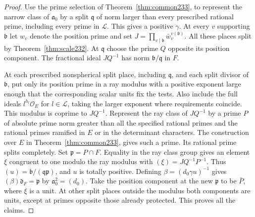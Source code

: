 \documentclass[a4paper,11pt]{article}
\theoremstyle{definition}
\theoremstyle{remark}
\numberwithin{equation}{section}
\newcommand{\OO}{\mathcal O}
\begin{document}
\begin{proof}
Use the prime selection of Theorem~\ref{thm:common233},
to represent the narrow class of \(\mathfrak a_0\) by a split
\(\mathfrak q\) of norm larger than every prescribed rational prime,
including every prime in \(\mathcal L\). This gives
a positive \(\gamma\). At every \(v\) supporting \(\mathfrak b\)
let \(w_v\) denote the position prime and set
\(J=\prod_{v\mid\mathfrak b}\bar w_v^{v(\mathfrak b)}\).
All these places split by Theorem~\ref{thm:scale232}.
At \(\mathfrak q\) choose the prime \(Q\) opposite its position
component. The fractional ideal \(JQ^{-1}\) has norm
\(\mathfrak b/\mathfrak q\) in \(F\).

At each prescribed nonspherical split place, including
\(\mathfrak q\), and each split divisor of \(\mathfrak b\), put
only its position prime in a ray modulus with a positive exponent
large enough that the corresponding scalar units fix the tests.
Also include the full ideals \(l^{h_l}\OO_E\) for \(l\in\mathcal L\),
taking the larger exponent where requirements coincide. This
modulus is coprime to \(JQ^{-1}\). Represent the ray class of
\(JQ^{-1}\) by a prime \(P\) of absolute prime norm greater than
all the specified rational primes and the rational primes ramified
in \(E\) or in the determinant characters. The construction over
\(E\) in Theorem~\ref{thm:common233}, gives such a
prime. Its rational prime splits completely. Set
\(\mathfrak p=P\cap F\). Equality in the ray class group gives
an element \(\xi\) congruent to one modulo the ray modulus with
\((\xi)=JQ^{-1}P^{-1}\). Thus
\((u)=\mathfrak b/(\mathfrak q\mathfrak p)\), and \(u\) is
totally positive. Defining \(\beta=(d_0\gamma u)^{-1}\) gives
\((\beta)\mathfrak d_F=\mathfrak p\) by \(\mathfrak a_0^2=(d_0)\).
Take the position component at the new \(\mathfrak p\) to be
\(\bar P\), where \(\xi\) is a unit. At other split places outside
the modulus both components are units, except at primes opposite
those already protected. This proves all the claims.
\end{proof}
\end{document}

